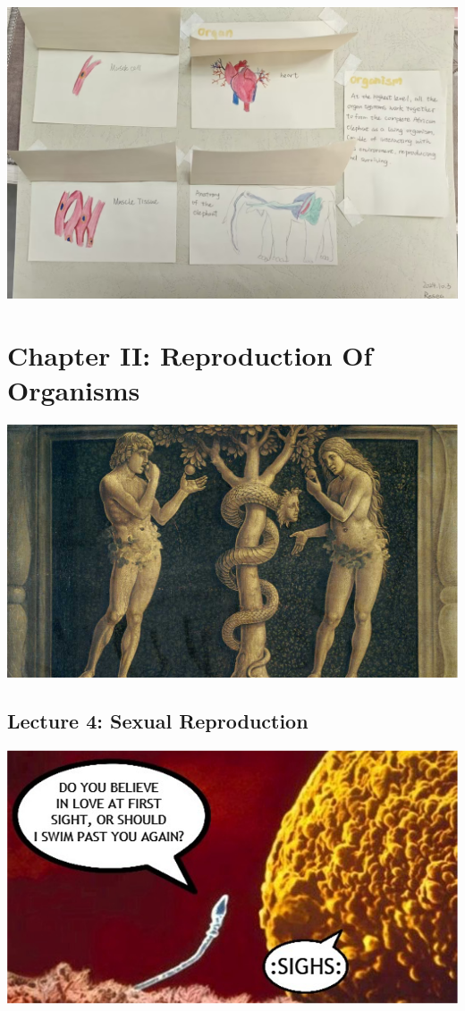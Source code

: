 \documentclass[
]{book}
\begin{document}
\includegraphics{./img/p2-2.jpg}

\hypertarget{chapter-ii-reproduction-of-organisms}{%
\chapter{Chapter II: Reproduction Of Organisms}\label{chapter-ii-reproduction-of-organisms}}

\includegraphics{./img/ch2.png}

\hypertarget{lecture-4-sexual-reproduction}{%
\section{Lecture 4: Sexual Reproduction}\label{lecture-4-sexual-reproduction}}

\includegraphics{./img/sperm-egg-meme.png}
\end{document}
